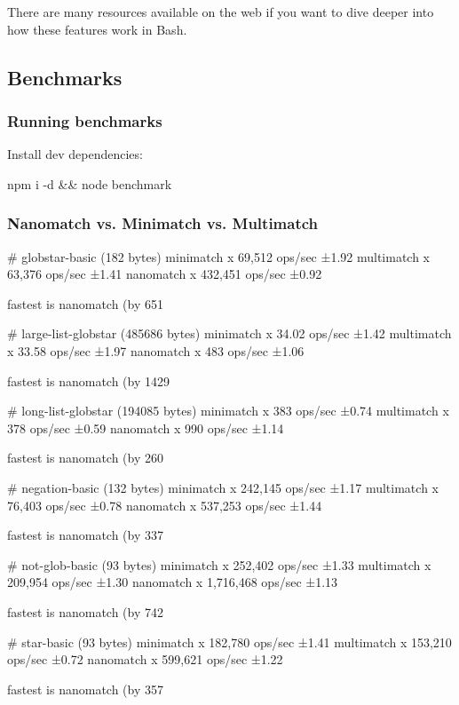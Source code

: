 There are many resources available on the web if you want to dive deeper into how these features work in Bash.

\subsection*{Benchmarks}

\subsubsection*{Running benchmarks}

Install dev dependencies\+:


\begin{DoxyCode}
npm i -d && node benchmark
\end{DoxyCode}


\subsubsection*{Nanomatch vs. Minimatch vs. Multimatch}


\begin{DoxyCode}
# globstar-basic (182 bytes)
  minimatch x 69,512 ops/sec ±1.92%
  multimatch x 63,376 ops/sec ±1.41%
  nanomatch x 432,451 ops/sec ±0.92%

  fastest is nanomatch (by 651%

# large-list-globstar (485686 bytes)
  minimatch x 34.02 ops/sec ±1.42%
  multimatch x 33.58 ops/sec ±1.97%
  nanomatch x 483 ops/sec ±1.06%

  fastest is nanomatch (by 1429%

# long-list-globstar (194085 bytes)
  minimatch x 383 ops/sec ±0.74%
  multimatch x 378 ops/sec ±0.59%
  nanomatch x 990 ops/sec ±1.14%

  fastest is nanomatch (by 260%

# negation-basic (132 bytes)
  minimatch x 242,145 ops/sec ±1.17%
  multimatch x 76,403 ops/sec ±0.78%
  nanomatch x 537,253 ops/sec ±1.44%

  fastest is nanomatch (by 337%

# not-glob-basic (93 bytes)
  minimatch x 252,402 ops/sec ±1.33%
  multimatch x 209,954 ops/sec ±1.30%
  nanomatch x 1,716,468 ops/sec ±1.13%

  fastest is nanomatch (by 742%

# star-basic (93 bytes)
  minimatch x 182,780 ops/sec ±1.41%
  multimatch x 153,210 ops/sec ±0.72%
  nanomatch x 599,621 ops/sec ±1.22%

  fastest is nanomatch (by 357%
\end{DoxyCode}


